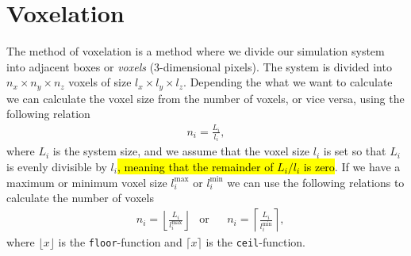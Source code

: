 
\section{Voxelation\label{sec:voxelation}}
The method of voxelation is a method where we divide our simulation system into adjacent boxes or \emph{voxels} (3-dimensional pixels). The system is divided into $n_x\times n_y\times n_z$ voxels of size $l_x\times l_y\times l_z$. Depending the what we want to calculate we can calculate the voxel size from the number of voxels, or vice versa, using the following relation
\begin{align*}
    n_i = \frac{L_i}{l_i},
\end{align*}
where $L_i$ is the system size, and we assume that the voxel size $l_i$ is set so that $L_i$ is evenly divisible by $l_i$\hl{, meaning that the remainder of $L_i/l_i$ is zero}. If we have a maximum or minimum voxel size $l_i^\text{max}$ or $l_i^\text{min}$ we can use the following relations to calculate the number of voxels
\begin{align*}
    &n_i=\left\lfloor\frac{L_i}{l_i^\text{max}}\right\rfloor &\text{or}& &n_i=\left\lceil\frac{L_i}{l_i^\text{min}}\right\rceil,
\end{align*}
where $\lfloor x \rfloor$ is the \Verb!floor!-function and $\lceil x \rceil$ is the \Verb!ceil!-function.

